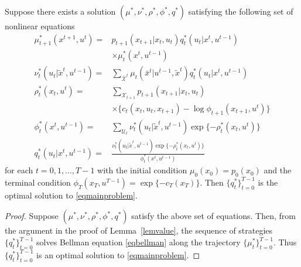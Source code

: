 \begin{theorem}
Suppose there exists a solution $(\mu^*, \nu^*, \rho^*, \phi^*, q^*)$ satisfying the following set of nonlinear equations
\begin{align*}
\mu_{t+1}^*(x^{t+1}, u^t)=&p_{t+1}(x_{t+1}|x_t, u_t)q_t^*(u_t|x^t, u^{t-1})\\
&\times \mu_t^*(x^t,u^{t-1}) \\
\nu_t^*(u_t|\tilde{x}^t, u^{t-1})=&\sum_{\bar{\mathcal{X}}^t}\mu_t(\bar{x}^t|u^{t-1}, \tilde{x}^t)q_t^*(u_t|x^t,u^{t-1}) \\
\rho_t^*(x_t, u^t)=&\sum_{\mathcal{X}_{t+1}}p_{t+1}(x_{t+1}|x_t, u_t) \\
&\times \{c_t(x_t, u_t, x_{t+1})-\log \phi_{t+1}(x_{t+1}, u^t)\} \\
\phi_t^*(x^t, u^{t-1})=&\sum_{\mathcal{U}_t} \nu_t^*(u_t|\tilde{x}^t, u^{t-1})\exp\{-\rho_t^*(x_t, u^t)\} \\
q_t^*(u_t|x^t, u^{t-1})=&\frac{\nu_t^*(u_t|\tilde{x}^t, u^{t-1})\exp\{-\rho_t^*(x_t, u^t)\}}{\phi_t^*(x^t, u^{t-1})}
\end{align*}
for each $t=0, 1, ..., T-1$ with the initial condition $\mu_0(x_0)=p_0(x_0)$ and the terminal condition $\phi_T(x_T, u^{T-1})=\exp\{-c_T(x_T)\}$. Then $\{q_t^*\}_{t=0}^{T-1}$ is the optimal solution to \eqref{eqmainproblem}.
\end{theorem}
\begin{proof}
	Suppose $(\mu^*, \nu^*, \rho^*, \phi^*, q^*)$ satisfy the above set of equations. Then, from the argument in the proof of Lemma~\ref{lemvalue}, the sequence of strategies $\{q_t^*\}_{t=0}^{T-1}$ solves Bellman equation \eqref{eqbellman} along the trajectory  $\{\mu_t^*\}_{t=0}^{T-1}$. Thus $\{q_t^*\}_{t=0}^{T-1}$ is an optimal solution to \eqref{eqmainproblem}.
\end{proof}
